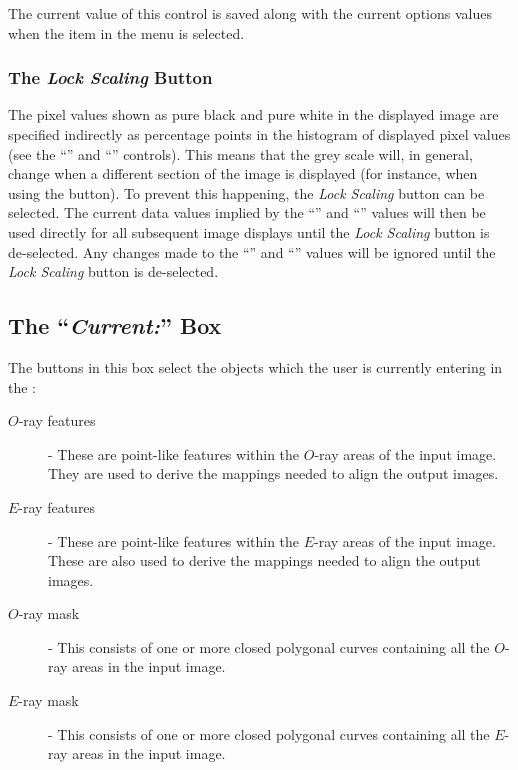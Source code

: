 The current value of this control is saved along with the current options
values when the  item in
the  menu is selected.

\subsubsection {The {\em Lock Scaling} Button}
The pixel values shown as pure black and pure white in the displayed
image are specified indirectly as percentage points in the histogram of
displayed pixel values (see the ``'' and ``''
controls). This means that the grey scale will, in general, change when a
different section of the image is displayed (for instance, when using the
 button). To prevent this happening, the
{\em Lock Scaling} button can be selected. The current data values
implied by the ``'' and
``'' values will then be used
directly for all subsequent image displays until the {\em Lock Scaling}
button is de-selected. Any changes made to the ``'' and ``''
values will be ignored until the {\em Lock Scaling} button is
de-selected.

\subsection {The ``{\em Current:}'' Box}
The buttons in this box select the objects which the user is currently
entering in the :

\begin{description}
\item [$O$-ray features] - These are point-like features within the
$O$-ray areas of the input image. They are used to derive the mappings
needed to align the output images.
\item [$E$-ray features] - These are point-like features within the
$E$-ray areas of the input image. These are also used to derive the mappings
needed to align the output images.
\item [$O$-ray mask] - This consists of one or more closed polygonal curves
containing all the $O$-ray areas in the input image. 
\item [$E$-ray mask] - This consists of one or more closed polygonal curves
containing all the $E$-ray areas in the input image. 
\end{description}

